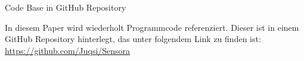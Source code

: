 \pagebreak
\hspace{0pt}
\vfill
\begin{center}
    \large{Code Base in GitHub Repository}
\end{center}
\vspace{1em}
\begin{center}
In diesem Paper wird wiederholt Programmcode referenziert. Dieser ist in einem GitHub Repository hinterlegt, das unter folgendem Link zu finden ist:
\\
\href{https://github.com/Juqsi/Sensora}{https://github.com/Juqsi/Sensora}
\end{center}
\vfill
\hspace{0pt}
\pagebreak
